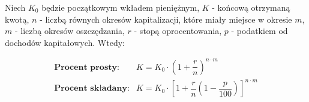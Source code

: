 \documentclass[14pt,a4paper]{extarticle}
\begin{document}
\noindent Niech $K_{0}$ będzie początkowym wkładem pieniężnym, $K$ - końcową otrzymaną kwotą, $n$ - liczbą równych okresów kapitalizacji, które miały miejsce w okresie $m$, $m$ - liczbą okresów oszczędzania, $r$ - stopą oprocentowania, $p$ - podatkiem od dochodów kapitałowych.
Wtedy:



\renewcommand{\arraystretch}{2}
\setlength{\arrayrulewidth}{0.5mm}

\begin{equation*}
   \begin{array}{lc}
      \textbf{Procent prosty:} & K = K_{0}\cdot\left(1+\dfrac{r}{n}\right)^{n\cdot m}\\
      \textbf{Procent składany:} & K = K_{0}\cdot\left[ 1+\dfrac{r}{n}\left(1 - \dfrac{p}{100}\right)\right]^{n\cdot m}
   \end{array}
\end{equation*}
\end{document}
